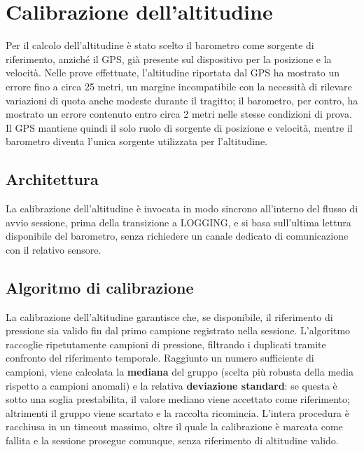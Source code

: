 \newpage

\section{Calibrazione dell'altitudine} \label{sec:calibrazione-altitudine}

Per il calcolo dell'altitudine è stato scelto il barometro come sorgente di
riferimento, anziché il GPS, già presente sul dispositivo per la posizione e
la velocità. Nelle prove effettuate, l'altitudine riportata dal GPS ha
mostrato un errore fino a circa 25 metri, un margine incompatibile con la
necessità di rilevare variazioni di quota anche modeste durante il tragitto;
il barometro, per contro, ha mostrato un errore contenuto entro circa 2
metri nelle stesse condizioni di prova. Il GPS mantiene quindi il solo ruolo
di sorgente di posizione e velocità, mentre il barometro diventa l'unica
sorgente utilizzata per l'altitudine.

\subsection{Architettura}

La calibrazione dell'altitudine è invocata in modo sincrono all'interno del flusso di avvio sessione, prima della transizione a LOGGING, e si basa
sull'ultima lettura disponibile del barometro, senza richiedere un canale dedicato di comunicazione con il relativo sensore.

\subsection{Algoritmo di calibrazione}

La calibrazione dell'altitudine garantisce che, se disponibile, il riferimento di pressione sia valido fin dal primo campione
registrato nella sessione. L'algoritmo raccoglie ripetutamente campioni di pressione, filtrando i duplicati tramite confronto del riferimento
temporale. Raggiunto un numero sufficiente di campioni, viene calcolata la \textbf{mediana} del gruppo (scelta più robusta della media rispetto a
campioni anomali) e la relativa \textbf{deviazione standard}: se questa è sotto una soglia prestabilita, il valore mediano viene accettato come
riferimento; altrimenti il gruppo viene scartato e la raccolta ricomincia. L'intera procedura è racchiusa in un timeout massimo, oltre il quale la
calibrazione è marcata come fallita e la sessione prosegue comunque, senza riferimento di altitudine valido.

